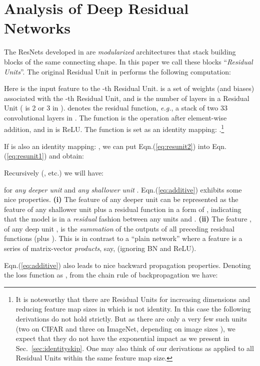 \documentclass[runningheads]{llncs}
\def\eg{\emph{e.g.}}
\begin{document}
\section{Analysis of Deep Residual Networks}

The ResNets developed in \cite{He2016} are \emph{modularized} architectures that stack building blocks of the same connecting shape. In this paper we call these blocks ``\emph{Residual Units}''. The original Residual Unit in \cite{He2016} performs the following computation:

Here  is the input feature to the -th Residual Unit.  is a set of weights (and biases) associated with the -th Residual Unit, and  is the number of layers in a Residual Unit ( is 2 or 3 in \cite{He2016}).  denotes the residual function, \eg, a stack of two 33 convolutional layers in \cite{He2016}. The function  is the operation after element-wise addition, and in \cite{He2016}  is ReLU. The function  is set as an identity mapping: .\footnote{It is noteworthy that there are Residual Units for increasing dimensions and reducing feature map sizes \cite{He2016} in which  is not identity.
In this case the following derivations do not hold strictly. But as there are only a very few such units (two on CIFAR and three on ImageNet, depending on image sizes \cite{He2016}), we expect that they do not have the exponential impact as we present in Sec.~\ref{sec:identityskip}. One may also think of our derivations as applied to all Residual Units within the same feature map size.}

If  is also an identity mapping: , we can put Eqn.(\ref{eq:resunit2}) into Eqn.(\ref{eq:resunit1}) and obtain:

Recursively ({\fontsize{8pt}{1em}}, etc.) we will have:

for \emph{any deeper unit}  and \emph{any shallower unit} . Eqn.(\ref{eq:additive}) exhibits some nice properties. \textbf{(i)} The feature  of any deeper unit  can be represented as the feature  of any shallower unit  plus a residual function in a form of , indicating that the model is in a \emph{residual} fashion between any units  and . \textbf{(ii)} The feature , of any deep unit ,  is the \emph{summation} of the outputs of all preceding residual functions (plus ). This is in contrast to a ``plain network'' where a feature  is a series of matrix-vector \emph{products}, say,  (ignoring BN and ReLU).

Eqn.(\ref{eq:additive}) also leads to nice backward propagation properties.
Denoting the loss function as , from the chain rule of backpropagation \cite{LeCun1989} we have:
\end{document}

